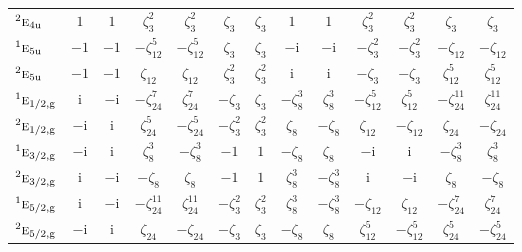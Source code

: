 \documentclass[10pt,a4paper]{article}
\makeatletter
\def\grouprule#1#2{\noalign{\marks\LTgroupmarks{\the\belowrulesep}\nobreak\vskip#1%
  \vskip\aboverulesep}\multispan\LT@cols\unskip{\leaders\hrule\@height#2\hfill\kern\z@}\cr
  \noalign{\penalty\LTrulebreak\vskip\belowrulesep\global\@lastruleclass\z@}}
\numberwithin{equation}{section}
\newcommand{\irr}[1]{\text{\normalfont\scshape #1}}
\newcommand{\conjpair}[1]{{}^{#1}}
\newcommand{\ptag}[1]{\mathrm{#1}}
\newcommand{\iunit}{\mathrm{i}}
\newcommand{\rootunity}[1]{\zeta_{#1}}
\makeatother
\begin{document}
{\begin{longtable}{@{}lcccccccccccc@{}}
$\conjpair{2}\irr{e}_{4\ptag{u}}$ & $1$ & $1$ & $\rootunity{3}^{2}$ & $\rootunity{3}^{2}$ & $\rootunity{3}$ & $\rootunity{3}$ & $1$ & $1$ & $\rootunity{3}^{2}$ & $\rootunity{3}^{2}$ & $\rootunity{3}$ & $\rootunity{3}$\\
$\conjpair{1}\irr{e}_{5\ptag{u}}$ & $-1$ & $-1$ & $-\rootunity{12}^{5}$ & $-\rootunity{12}^{5}$ & $\rootunity{3}$ & $\rootunity{3}$ & $-\iunit{}$ & $-\iunit{}$ & $-\rootunity{3}^{2}$ & $-\rootunity{3}^{2}$ & $-\rootunity{12}$ & $-\rootunity{12}$\\
$\conjpair{2}\irr{e}_{5\ptag{u}}$ & $-1$ & $-1$ & $\rootunity{12}$ & $\rootunity{12}$ & $\rootunity{3}^{2}$ & $\rootunity{3}^{2}$ & $\iunit{}$ & $\iunit{}$ & $-\rootunity{3}$ & $-\rootunity{3}$ & $\rootunity{12}^{5}$ & $\rootunity{12}^{5}$\\
\grouprule{0pt}{\lightrulewidth}
$\conjpair{1}\irr{e}_{1/2,\ptag{g}}$ & $\iunit{}$ & $-\iunit{}$ & $-\rootunity{24}^{7}$ & $\rootunity{24}^{7}$ & $-\rootunity{3}$ & $\rootunity{3}$ & $-\rootunity{8}^{3}$ & $\rootunity{8}^{3}$ & $-\rootunity{12}^{5}$ & $\rootunity{12}^{5}$ & $-\rootunity{24}^{11}$ & $\rootunity{24}^{11}$\\
$\conjpair{2}\irr{e}_{1/2,\ptag{g}}$ & $-\iunit{}$ & $\iunit{}$ & $\rootunity{24}^{5}$ & $-\rootunity{24}^{5}$ & $-\rootunity{3}^{2}$ & $\rootunity{3}^{2}$ & $\rootunity{8}$ & $-\rootunity{8}$ & $\rootunity{12}$ & $-\rootunity{12}$ & $\rootunity{24}$ & $-\rootunity{24}$\\
$\conjpair{1}\irr{e}_{3/2,\ptag{g}}$ & $-\iunit{}$ & $\iunit{}$ & $\rootunity{8}^{3}$ & $-\rootunity{8}^{3}$ & $-1$ & $1$ & $-\rootunity{8}$ & $\rootunity{8}$ & $-\iunit{}$ & $\iunit{}$ & $-\rootunity{8}^{3}$ & $\rootunity{8}^{3}$\\
$\conjpair{2}\irr{e}_{3/2,\ptag{g}}$ & $\iunit{}$ & $-\iunit{}$ & $-\rootunity{8}$ & $\rootunity{8}$ & $-1$ & $1$ & $\rootunity{8}^{3}$ & $-\rootunity{8}^{3}$ & $\iunit{}$ & $-\iunit{}$ & $\rootunity{8}$ & $-\rootunity{8}$\\
$\conjpair{1}\irr{e}_{5/2,\ptag{g}}$ & $\iunit{}$ & $-\iunit{}$ & $-\rootunity{24}^{11}$ & $\rootunity{24}^{11}$ & $-\rootunity{3}^{2}$ & $\rootunity{3}^{2}$ & $\rootunity{8}^{3}$ & $-\rootunity{8}^{3}$ & $-\rootunity{12}$ & $\rootunity{12}$ & $-\rootunity{24}^{7}$ & $\rootunity{24}^{7}$\\
$\conjpair{2}\irr{e}_{5/2,\ptag{g}}$ & $-\iunit{}$ & $\iunit{}$ & $\rootunity{24}$ & $-\rootunity{24}$ & $-\rootunity{3}$ & $\rootunity{3}$ & $-\rootunity{8}$ & $\rootunity{8}$ & $\rootunity{12}^{5}$ & $-\rootunity{12}^{5}$ & $\rootunity{24}^{5}$ & $-\rootunity{24}^{5}$\\

\end{longtable}}
\end{document}

